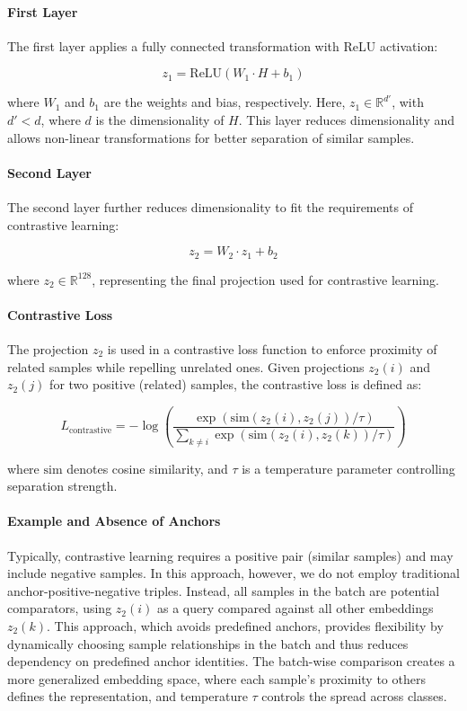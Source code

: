 \documentclass[9pt,a4paper,twoside]{rho-class/rho}
\begin{document}
\paragraph{First Layer}
The first layer applies a fully connected transformation with ReLU activation:

\[
z_1 = \text{ReLU}(W_1 \cdot H + b_1)
\]

where \( W_1 \) and \( b_1 \) are the weights and bias, respectively. Here, \( z_1 \in \mathbb{R}^{d'} \), with \( d' < d \), where \( d \) is the dimensionality of \( H \). This layer reduces dimensionality and allows non-linear transformations for better separation of similar samples.

\paragraph{Second Layer}
The second layer further reduces dimensionality to fit the requirements of contrastive learning:

\[
z_2 = W_2 \cdot z_1 + b_2
\]

where \( z_2 \in \mathbb{R}^{128} \), representing the final projection used for contrastive learning.

\paragraph{Contrastive Loss}
The projection \( z_2 \) is used in a contrastive loss function to enforce proximity of related samples while repelling unrelated ones. Given projections \( z_2(i) \) and \( z_2(j) \) for two positive (related) samples, the contrastive loss is defined as:

\[
L_{\text{contrastive}} = -\log\left(\frac{\exp\left(\text{sim}(z_2(i), z_2(j)) / \tau\right)}{\sum_{k \neq i} \exp\left(\text{sim}(z_2(i), z_2(k)) / \tau\right)}\right)
\]

where \( \text{sim} \) denotes cosine similarity, and \( \tau \) is a temperature parameter controlling separation strength.

\paragraph{Example and Absence of Anchors}
Typically, contrastive learning requires a positive pair (similar samples) and may include negative samples. In this approach, however, we do not employ traditional anchor-positive-negative triples. Instead, all samples in the batch are potential comparators, using \( z_2(i) \) as a query compared against all other embeddings \( z_2(k) \). This approach, which avoids predefined anchors, provides flexibility by dynamically choosing sample relationships in the batch and thus reduces dependency on predefined anchor identities. The batch-wise comparison creates a more generalized embedding space, where each sample’s proximity to others defines the representation, and temperature \( \tau \) controls the spread across classes.
\end{document}
